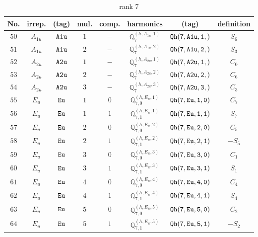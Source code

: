 \documentclass[fleqn,8pt]{jsarticle}
\begin{document}
\begin{table}[ht!]
\begin{center}
\caption{rank 7}
\renewcommand{\arraystretch}{1.3}
\begin{tabular}{cccccccc} \hline \hline
No. & irrep. & (tag) & mul. & comp. & harmonics & (tag) & definition \\ \hline
$ 50 $ & $ A_{1u} $ & $ {\tt A1u} $ & $ 1 $ & $ - $ & $ \mathbb{Q}_{7}^{(h,A_{1u},1)} $ & $ {\tt Qh(7,A1u,1,)} $ & $ S_{6} $ \\
$ 51 $ & $ A_{1u} $ & $ {\tt A1u} $ & $ 2 $ & $ - $ & $ \mathbb{Q}_{7}^{(h,A_{1u},2)} $ & $ {\tt Qh(7,A1u,2,)} $ & $ S_{3} $ \\
$ 52 $ & $ A_{2u} $ & $ {\tt A2u} $ & $ 1 $ & $ - $ & $ \mathbb{Q}_{7}^{(h,A_{2u},1)} $ & $ {\tt Qh(7,A2u,1,)} $ & $ C_{0} $ \\
$ 53 $ & $ A_{2u} $ & $ {\tt A2u} $ & $ 2 $ & $ - $ & $ \mathbb{Q}_{7}^{(h,A_{2u},2)} $ & $ {\tt Qh(7,A2u,2,)} $ & $ C_{6} $ \\
$ 54 $ & $ A_{2u} $ & $ {\tt A2u} $ & $ 3 $ & $ - $ & $ \mathbb{Q}_{7}^{(h,A_{2u},3)} $ & $ {\tt Qh(7,A2u,3,)} $ & $ C_{3} $ \\
$ 55 $ & $ E_{u} $ & $ {\tt Eu} $ & $ 1 $ & $ 0 $ & $ \mathbb{Q}_{7,0}^{(h,E_{u},1)} $ & $ {\tt Qh(7,Eu,1,0)} $ & $ C_{7} $ \\
$ 56 $ & $ E_{u} $ & $ {\tt Eu} $ & $ 1 $ & $ 1 $ & $ \mathbb{Q}_{7,1}^{(h,E_{u},1)} $ & $ {\tt Qh(7,Eu,1,1)} $ & $ S_{7} $ \\
$ 57 $ & $ E_{u} $ & $ {\tt Eu} $ & $ 2 $ & $ 0 $ & $ \mathbb{Q}_{7,0}^{(h,E_{u},2)} $ & $ {\tt Qh(7,Eu,2,0)} $ & $ C_{5} $ \\
$ 58 $ & $ E_{u} $ & $ {\tt Eu} $ & $ 2 $ & $ 1 $ & $ \mathbb{Q}_{7,1}^{(h,E_{u},2)} $ & $ {\tt Qh(7,Eu,2,1)} $ & $ - S_{5} $ \\
$ 59 $ & $ E_{u} $ & $ {\tt Eu} $ & $ 3 $ & $ 0 $ & $ \mathbb{Q}_{7,0}^{(h,E_{u},3)} $ & $ {\tt Qh(7,Eu,3,0)} $ & $ C_{1} $ \\
$ 60 $ & $ E_{u} $ & $ {\tt Eu} $ & $ 3 $ & $ 1 $ & $ \mathbb{Q}_{7,1}^{(h,E_{u},3)} $ & $ {\tt Qh(7,Eu,3,1)} $ & $ S_{1} $ \\
$ 61 $ & $ E_{u} $ & $ {\tt Eu} $ & $ 4 $ & $ 0 $ & $ \mathbb{Q}_{7,0}^{(h,E_{u},4)} $ & $ {\tt Qh(7,Eu,4,0)} $ & $ C_{4} $ \\
$ 62 $ & $ E_{u} $ & $ {\tt Eu} $ & $ 4 $ & $ 1 $ & $ \mathbb{Q}_{7,1}^{(h,E_{u},4)} $ & $ {\tt Qh(7,Eu,4,1)} $ & $ S_{4} $ \\
$ 63 $ & $ E_{u} $ & $ {\tt Eu} $ & $ 5 $ & $ 0 $ & $ \mathbb{Q}_{7,0}^{(h,E_{u},5)} $ & $ {\tt Qh(7,Eu,5,0)} $ & $ C_{2} $ \\
$ 64 $ & $ E_{u} $ & $ {\tt Eu} $ & $ 5 $ & $ 1 $ & $ \mathbb{Q}_{7,1}^{(h,E_{u},5)} $ & $ {\tt Qh(7,Eu,5,1)} $ & $ - S_{2} $ \\
 \hline \hline
\end{tabular}
\end{center}
\end{table}
\end{document}
